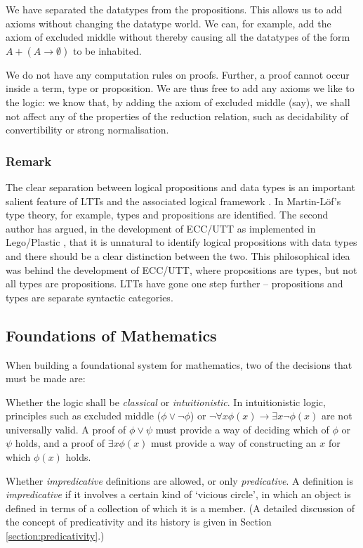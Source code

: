 \documentclass[acmtocl]{acmtrans2m}
\begin{document}
\begin{longitem}
\item
We have separated the datatypes from the propositions.  This allows us to add axioms without changing the datatype world.  We can, for example, add the axiom of excluded middle without thereby causing all the datatypes of the form $A + (A \rightarrow \emptyset)$ to be inhabited.
\item
We do not have any computation rules on proofs.  Further, a proof cannot occur inside a term, type or proposition.  We are thus free to add any axioms we like to the logic: we know that, by adding the axiom of excluded middle (say),  we shall not affect any of the properties of the reduction relation, such as decidability of convertibility or strong normalisation.
\end{longitem}

\subsubsection{Remark} The clear separation between logical
propositions and data types is an important salient feature of LTTs
\cite{ag:cpdtt,ga:gticst} and the associated logical framework
\cite{luo:LTT06}. In Martin-L\"{o}f's type theory, for example,
types and propositions are identified. The second author has argued,
in the development of ECC/UTT \cite{luo:car} as implemented in
Lego/Plastic \cite{legomanual:Report,plastic}, that it is unnatural
to identify logical propositions with data types and there should be
a clear distinction between the two. This philosophical idea was
behind the development of ECC/UTT, where propositions are types, but not all types are propositions.
LTTs have
gone one step further -- propositions and types are separate syntactic categories.


\subsection{Foundations of Mathematics}

When building a foundational system for mathematics, two of the decisions that must be made are:
\begin{longenum}
 \item Whether the logic shall be \emph{classical} or \emph{intuitionistic}.  In intuitionistic logic, principles such as excluded middle ($\phi \vee \neg \phi$) or $\neg \forall x \phi(x) \rightarrow \exists x \neg \phi(x)$ are not universally valid.  A proof of $\phi \vee \psi$ must provide a way of deciding which of $\phi$ or $\psi$ holds, and a proof of $\exists x \phi(x)$ must provide a way of constructing an $x$ for which $\phi(x)$ holds.
\item Whether \emph{impredicative} definitions are allowed, or only \emph{predicative}.  A definition is \emph{impredicative} if it involves a certain kind of `vicious circle', in which an object is defined in terms of a collection of which it is a member.  (A detailed discussion of the concept of predicativity and its history is given in Section \ref{section:predicativity}.)
\end{longenum}
\end{document}
